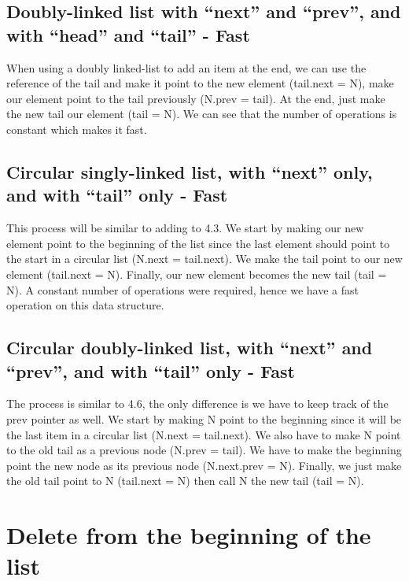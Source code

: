 \documentclass{article}
\begin{document}
\subsection{Doubly-linked list with “next” and “prev”, and with “head” and “tail” - Fast}
When using a doubly linked-list to add an item at the end, we can use the reference of the tail and make it point to the new element (tail.next = N), make our element point to the tail previously (N.prev = tail). At the end, just make the new tail our element (tail = N). We can see that the number of operations is constant which makes it fast.

\subsection{Circular singly-linked list, with “next” only, and with “tail” only - Fast}
This process will be similar to adding to 4.3. We start by making our new element point to the beginning of the list since the last element should point to the start in a circular list (N.next = tail.next). We make the tail point to our new element (tail.next = N). Finally, our new element becomes the new tail (tail = N). A constant number of operations were required, hence we have a fast operation on this data structure.

\subsection{Circular doubly-linked list, with “next” and “prev”, and with “tail” only - Fast}
The process is similar to 4.6, the only difference is we have to keep track of the prev pointer as well. We start by making N point to the beginning since it will be the last item in a circular list (N.next = tail.next). We also have to make N point to the old tail as a previous node (N.prev = tail). We have to make the beginning point the new node as its previous node (N.next.prev = N). Finally, we just make the old tail point to N (tail.next = N) then call N the new tail (tail = N).



\section{Delete from the beginning of the list}
\end{document}
